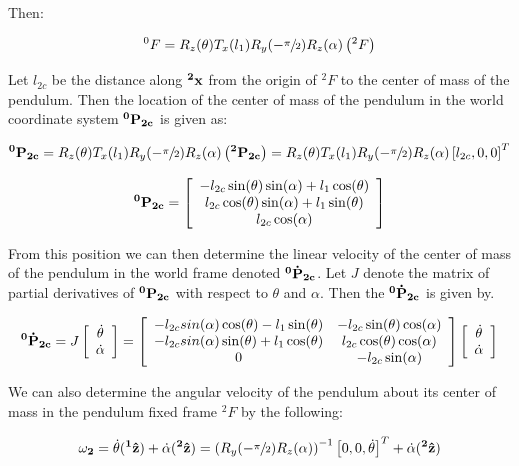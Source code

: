 \documentclass{article}
\theoremstyle{plain}
\theoremstyle{definition}
\theoremstyle{remark}
\begin{document}
Then:

$$ ^0F = R_{z}(\theta) T_{x}(l_{1}) R_{y}(-\sfrac{\pi}{2}) R_{z}(\alpha) \left(^2F\right) $$

Let $l_{2c}$ be the distance along $\bf{^2x}$ from the origin of $^2F$ to the center of mass of the pendulum.  Then the location of the center of mass of the pendulum in the world coordinate system $\bf{^0P_{2c}}$ is given as:

$$ {\bf{^0P_{2c}}} = R_{z}(\theta) T_{x}(l_{1}) R_{y}(-\sfrac{\pi}{2}) R_{z}(\alpha) \left(\bf{^2P_{2c}}\right) = R_{z}(\theta) T_{x}(l_{1}) R_{y}(-\sfrac{\pi}{2}) R_{z}(\alpha) \left[l_{2c}, 0, 0\right]^T$$

\[
  {\bf{^0P_{2c}}} = \left[
  \begin{array}{c l}
	 -l_{2c} \sin(\theta) \sin(\alpha) + l_{1} \cos(\theta) \\
	l_{2c} \cos(\theta) \sin(\alpha) + l_1 \sin(\theta) \\
	l_{2c} \cos(\alpha) 
  \end{array} \right]
\]

From this position we can then determine the linear velocity of the center of mass of the pendulum in the world frame denoted $\bf{^0\dot{P}_{2c}}$.  Let $J$ denote the matrix of partial derivatives of $\bf{^0P_{2c}}$ with respect to $\theta$ and $\alpha$.  Then the $\bf{^0\dot{P}_{2c}}$ is given by.

$$ {\bf{^0\dot{P}_{2c}}} = J \left[ \begin{array}{c l} \dot{\theta} \\ \dot{\alpha} \end{array} \right] = \left[ \begin{array}{c c l} 
	-l_{2c} sin(\alpha) \cos(\theta) - l_{1} \sin(\theta)  &  -l_{2c} \sin(\theta) \cos(\alpha) \\
	-l_{2c} sin(\alpha) \sin(\theta) + l_1 \cos(\theta) & l_{2c} \cos(\theta) \cos(\alpha) \\
	0 & -l_{2c} \sin(\alpha) \\ \end{array} \right] \left[ \begin{array}{c l} \dot{\theta} \\ \dot{\alpha} \end{array} \right]$$

We can also determine the angular velocity of the pendulum about its center of mass in the pendulum fixed frame $^2F$  by the following:

$$ {\bf{\omega_{2}}}= \dot{\theta} ({\bf{^1\hat{z}}}) + \dot{\alpha}({\bf{^2\hat{z}}})  = \left( R_{y}(-\sfrac{\pi}{2}) R_{z}(\alpha)\right)^{-1} \left[ 0, 0, \dot{\theta} \right]^T + \dot{\alpha}({\bf{^2\hat{z}}})$$
\end{document}
